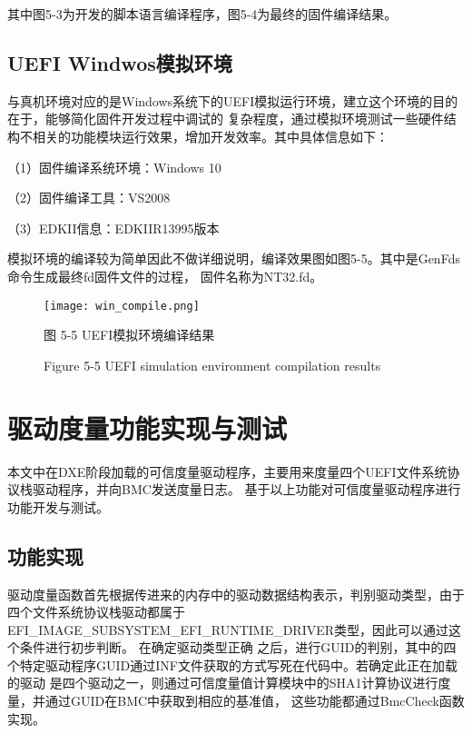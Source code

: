 其中图5-3为开发的脚本语言编译程序，图5-4为最终的固件编译结果。

\subsection{UEFI Windwos模拟环境}
与真机环境对应的是Windows系统下的UEFI模拟运行环境，建立这个环境的目的在于，能够简化固件开发过程中调试的
复杂程度，通过模拟环境测试一些硬件结构不相关的功能模块运行效果，增加开发效率。其中具体信息如下：
\par （1）固件编译系统环境：Windows 10
\par （2）固件编译工具：VS2008
\par （3）EDKII信息：EDKIIR13995版本
\par 模拟环境的编译较为简单因此不做详细说明，编译效果图如图5-5。其中是GenFds命令生成最终fd固件文件的过程，
固件名称为NT32.fd。

\begin{figure}[htb]
    \vspace{0cm}   
    \setlength{\abovecaptionskip}{0.3cm}
	\centering
    \texttt{[image: win\_compile.png]}
    \caption*{图 5-5 UEFI模拟环境编译结果}
    \setlength{\belowcaptionskip}{-0.7cm}
    \caption*{Figure 5-5 UEFI simulation environment compilation results}
\end{figure}

%
%
\section{驱动度量功能实现与测试}
本文中在DXE阶段加载的可信度量驱动程序，主要用来度量四个UEFI文件系统协议栈驱动程序，并向BMC发送度量日志。
基于以上功能对可信度量驱动程序进行功能开发与测试。

\subsection{功能实现}
驱动度量函数首先根据传进来的内存中的驱动数据结构表示，判别驱动类型，由于四个文件系统协议栈驱动都属于
EFI\_IMAGE\_SUBSYSTEM\_EFI\_RUNTIME\_DRIVER类型\cite{addition3}，因此可以通过这个条件进行初步判断。
在确定驱动类型正确
之后，进行GUID的判别，其中的四个特定驱动程序GUID通过INF文件获取的方式写死在代码中。若确定此正在加载的驱动
是四个驱动之一，则通过可信度量值计算模块中的SHA1计算协议进行度量，并通过GUID在BMC中获取到相应的基准值，
这些功能都通过BmcCheck函数实现。

